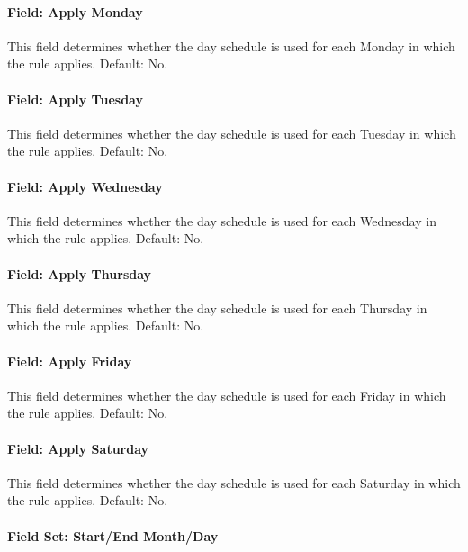 \paragraph{Field: Apply Monday}\label{field-apply-monday-scheduleweekrule}

This field determines whether the day schedule is used for each Monday in which the rule applies.
Default: No.

\paragraph{Field: Apply Tuesday}\label{field-apply-tuesday-scheduleweekrule}

This field determines whether the day schedule is used for each Tuesday in which the rule applies.
Default: No.

\paragraph{Field: Apply Wednesday}\label{field-apply-wednesday-scheduleweekrule}

This field determines whether the day schedule is used for each Wednesday in which the rule applies.
Default: No.

\paragraph{Field: Apply Thursday}\label{field-apply-thursday-scheduleweekrule}

This field determines whether the day schedule is used for each Thursday in which the rule applies.
Default: No.

\paragraph{Field: Apply Friday}\label{field-apply-friday-scheduleweekrule}

This field determines whether the day schedule is used for each Friday in which the rule applies.
Default: No.

\paragraph{Field: Apply Saturday}\label{field-apply-saturday-scheduleweekrule}

This field determines whether the day schedule is used for each Saturday in which the rule applies.
Default: No.

\paragraph{Field Set: Start/End Month/Day}

